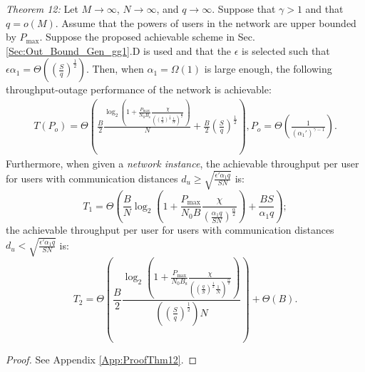 \documentclass[journal,draftclsnofoot,onecolumn,12pt,twoside]{IEEEtran}
\begin{document}
{\em Theorem 12:} Let $M\to\infty$, $N\to\infty$, and $q\to\infty$. Suppose that $\gamma>1$ and that $q=o(M)$. Assume that the powers of users in the network are upper bounded by $P_{\text{max}}$. Suppose the proposed achievable scheme in Sec. \ref{Sec:Out_Bound_Gen_gg1}.D is used and that the $\epsilon$ is selected such that $\epsilon\alpha_1=\Theta\left(\left(\frac{S}{q}\right)^{\frac{1}{2}}\right)$. Then, when $\alpha_1=\Omega(1)$ is large enough, the following throughput-outage performance of the network is achievable:
\begin{equation}
\begin{aligned}
T(P_o)=\Theta\left(\frac{B}{2}\frac{\log_2\left(1+\frac{P_{\text{max}}}{N_0B_{\text{s}}}\frac{\chi}{\left(\left(\frac{q}{S}\right)^{\frac{1}{2}}\frac{1}{N}\right)^\frac{\alpha}{2}}\right)}{N}+\frac{B}{2}\left(\frac{S}{q}\right)^{\frac{1}{2}}\right),P_o=\Theta\left(\frac{1}{(\alpha_1')^{\gamma-1}}\right).
\end{aligned}
\end{equation}
Furthermore, when given a {\em network instance}, the achievable throughput per user for users with communication distances $d_u\geq \sqrt{\frac{\epsilon'\alpha_1 q}{SN}}$ is:
\begin{equation}
T_1=\Theta\left(\frac{B}{N}\log_2\left(1+\frac{P_{\text{max}}}{N_0B}\frac{\chi}{\left(\frac{\alpha_1 q}{SN}\right)^\frac{\alpha}{2}}\right)+\frac{BS}{\alpha_1 q}\right);
\end{equation}
the achievable throughput per user for users with communication distances $d_u<\sqrt{\frac{\epsilon'\alpha_1 q}{SN}}$ is:
\begin{equation}
T_2=\Theta\left(\frac{B}{2}\frac{\log_2\left(1+\frac{P_{\text{max}}}{N_0B_{\text{s}}}\frac{\chi}{\left(\left(\frac{q}{S}\right)^{\frac{1}{2}}\frac{1}{N}\right)^\frac{\alpha}{2}}\right)}{\left(\left(\frac{S}{q}\right)^{\frac{1}{2}}\right)N}\right)+\Theta(B).
\end{equation}

\begin{proof}
See Appendix \ref{App:ProofThm12}.
\end{proof}
\end{document}
